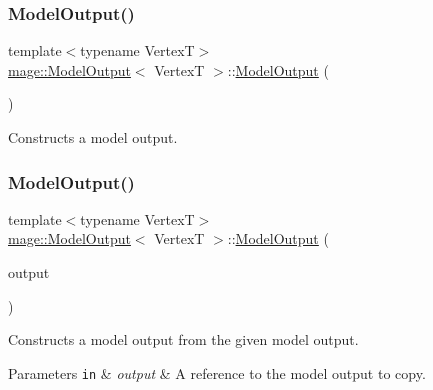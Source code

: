 \subsubsection{\texorpdfstring{Model\+Output()}{ModelOutput()}\hspace{0.1cm}{\footnotesize\ttfamily [1/3]}}
{\footnotesize\ttfamily template$<$typename VertexT$>$ \\
\hyperlink{structmage_1_1_model_output}{mage\+::\+Model\+Output}$<$ VertexT $>$\+::\hyperlink{structmage_1_1_model_output}{Model\+Output} (\begin{DoxyParamCaption}{ }\end{DoxyParamCaption})\hspace{0.3cm}{\ttfamily [default]}}

Constructs a model output. \hypertarget{structmage_1_1_model_output_aac808e40a66f33da4ea28ebb7443623d}{}\label{structmage_1_1_model_output_aac808e40a66f33da4ea28ebb7443623d} 
\subsubsection{\texorpdfstring{Model\+Output()}{ModelOutput()}\hspace{0.1cm}{\footnotesize\ttfamily [2/3]}}
{\footnotesize\ttfamily template$<$typename VertexT$>$ \\
\hyperlink{structmage_1_1_model_output}{mage\+::\+Model\+Output}$<$ VertexT $>$\+::\hyperlink{structmage_1_1_model_output}{Model\+Output} (\begin{DoxyParamCaption}\item[{const \hyperlink{structmage_1_1_model_output}{Model\+Output}$<$ VertexT $>$ \&}]{output }\end{DoxyParamCaption})\hspace{0.3cm}{\ttfamily [delete]}}

Constructs a model output from the given model output.


\begin{DoxyParams}[1]{Parameters}
\mbox{\tt in}  & {\em output} & A reference to the model output to copy. \\
\hline
\end{DoxyParams}
\hypertarget{structmage_1_1_model_output_a20faa6e5b76ec7903a09e222e61e5353}{}\label{structmage_1_1_model_output_a20faa6e5b76ec7903a09e222e61e5353} 
